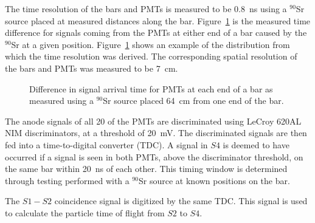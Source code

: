 The time resolution of the bars and PMTs is measured to be 0.8~ns using a $^{90}$Sr source placed at measured distances along the bar.
Figure~\ref{fig:s4Res} is the measured time difference for signals coming from the PMTs at either end of a bar caused by the $^{90}$Sr at a given position.
Figure~\ref{fig:s4Res} shows an example of the distribution from which the time resolution was derived.
The corresponding spatial resolution of the bars and PMTs was measured to be 7~cm.

\begin{figure}[ht]
  \begin{adjustbox}{max totalsize={.6\textwidth}{.5\textheight},center}
    
  \end{adjustbox}
  \caption{Difference in signal arrival time for PMTs at each end of a bar as measured using a $^{90}$Sr source placed 64~cm from one end of the bar.}
  \label{fig:s4Res}	
\end{figure}


The anode signals of all 20 of the PMTs are discriminated using LeCroy 620AL NIM discriminators, at a threshold of 20~mV.
The discriminated signals are then fed into a time-to-digital converter (TDC). A signal in $\mathit{S4}$ is deemed to have occurred if a signal is seen in both PMTs, above the discriminator threshold, on the same bar within 20~ns of each other. 
This timing window is determined through testing performed with a $^{90}$Sr source at known positions on the bar.

The $\mathit{S1-S2}$ coincidence signal is digitized by the same TDC. This signal is used to calculate the particle time of flight from $\mathit{S2}$ to $\mathit{S4}$.

